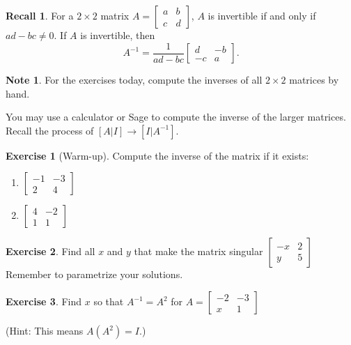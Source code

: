 \documentclass[handout]{beamer}
\newcommand{\fn}{\insertframenumber}
\theoremstyle{definition}
\newtheorem{exercise}{Exercise}
\newtheorem*{nb}{Note}
\newtheorem*{recall}{Recall}
\begin{document}
\begin{frame}{\fn}
	\begin{recall}
		For a $2\times 2$ matrix $A=\begin{bmatrix}
		a&b\\c&d
		\end{bmatrix}$, $A$ is invertible if and only if $ad-bc\neq 0$.  If $A$ is invertible, then
			\[A^{-1}=\frac{1}{ad-bc}\begin{bmatrix}
			d&-b\\-c&a
			\end{bmatrix}.\]
	\end{recall}
	\begin{nb}
		For the exercises today, compute the inverses of all $2\times 2 $ matrices by hand.
		
		You may use a calculator or Sage to compute the inverse of the larger matrices.  Recall the process of $[A|I]\rightarrow[I|A^{-1}]$.
	\end{nb}
\end{frame}
\begin{frame}{\fn}
	\begin{exercise}[Warm-up]
		Compute the inverse of the matrix if it exists:
			\begin{enumerate}[label=(\alph*)]
				\item $\begin{bmatrix}-1&-3\\2&4\end{bmatrix}$
				\item $\begin{bmatrix}4&-2\\1&1\end{bmatrix}$
			\end{enumerate}
	\end{exercise}
	\begin{exercise}
	Find all $x$ and $y$ that make the matrix singular
	$\begin{bmatrix}
	-x&2\\y&5
	\end{bmatrix}$
	Remember to parametrize your solutions.
	\end{exercise}
	\begin{exercise}
		Find $x$ so that $A^{-1}=A^2$ for $A=\left[\begin{array}{rr}
		-2 & -3 \\
		x & 1
		\end{array}\right]$
		
		(Hint: This means $A(A^2)=I$.)
	\end{exercise}
\end{frame}
\end{document}
